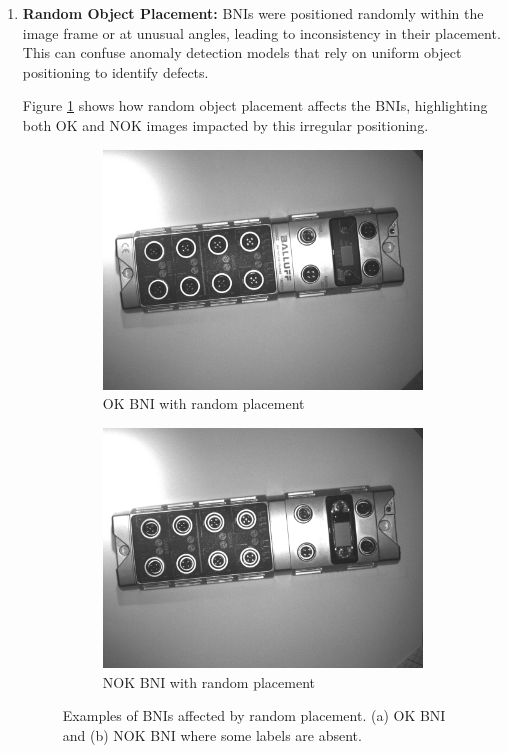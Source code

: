 \documentclass[12pt,DIV14,BCOR12mm,a4paper,footinclude=false,headinclude,parskip=half-,twoside,openright,cleardoublepage=empty,toc=index,bibliography=totoc,listof=totoc]{scrreprt}
\numberwithin{equation}{chapter}
\begin{document}
\begin{enumerate}
    \item \textbf{Random Object Placement:} BNIs were positioned randomly within the image frame or at unusual angles, leading to inconsistency in their placement. This can confuse anomaly detection models that rely on uniform object positioning to identify defects.
    
	Figure \ref{fig:random_placement} shows how random object placement affects the BNIs, highlighting both OK and NOK images impacted by this irregular positioning.
    \begin{figure}
        \centering
        \begin{subfigure}[b]{0.45\textwidth}
            \centering
            \includegraphics[scale=0.15]{../media/BNI-influence-random-OK.png}
            \caption{OK BNI with random placement}
        \end{subfigure}
        \hfill
        \begin{subfigure}[b]{0.45\textwidth}
            \centering
            \includegraphics[scale=0.15]{../media/BNI-influence-random-NOK.png}
            \caption{NOK BNI with random placement}
        \end{subfigure}
        \caption{Examples of BNIs affected by random placement. (a) OK BNI and (b) NOK BNI where some labels are absent.}
        \label{fig:random_placement}
    \end{figure}
\end{enumerate}
\end{document}
